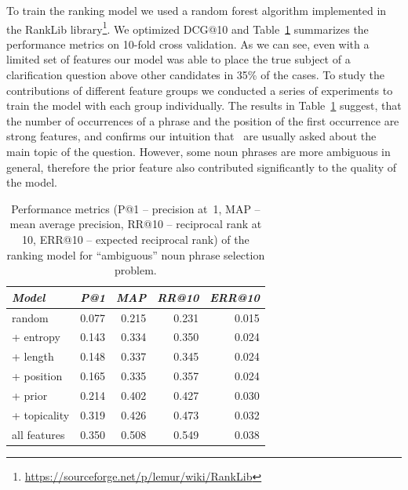 To train the ranking model we used a random forest algorithm implemented in the RankLib library\footnote{\href{url}{https://sourceforge.net/p/lemur/wiki/RankLib}}.
We optimized DCG@10 and Table~\ref{table:conversation:clarq:np_rank_performance} summarizes the performance metrics on 10-fold cross validation.
As we can see, even with a limited set of features our model was able to place the true subject of a clarification question above other candidates in 35\% of the cases.
To study the contributions of different feature groups we conducted a series of experiments to train the model with each group individually.
The results in Table~\ref{table:conversation:clarq:np_rank_performance} suggest, that the number of occurrences of a phrase and the position of the first occurrence are strong features, and confirms our intuition that \clarQ~are usually asked about the main topic of the question.
However, some noun phrases are more ambiguous in general, therefore the prior feature also contributed significantly to the quality of the model.

\begin{table}[h]
\centering
\begin{tabular}[t]{lrrrr}
\textit{Model} & \textit{P@1} & \textit{MAP} & \textit{RR@10} & \textit{ERR@10} \\
\hline
random & 0.077 & 0.215 & 0.231 & 0.015 \\
+ entropy & 0.143 & 0.334 & 0.350 & 0.024 \\
+ length & 0.148 & 0.337 & 0.345 & 0.024 \\
+ position & 0.165 & 0.335 & 0.357 & 0.024 \\
+ prior & 0.214 & 0.402 & 0.427 & 0.030 \\
+ topicality & 0.319 & 0.426 & 0.473 & 0.032 \\
all features & 0.350 & 0.508 & 0.549 & 0.038 \\
\end{tabular}
\caption{Performance metrics (P@1 -- precision at~1, MAP -- mean average precision, RR@10 -- reciprocal rank at 10, ERR@10 -- expected reciprocal rank) of the ranking model for ``ambiguous'' noun phrase selection problem.}
\label{table:conversation:clarq:np_rank_performance}
\end{table}

